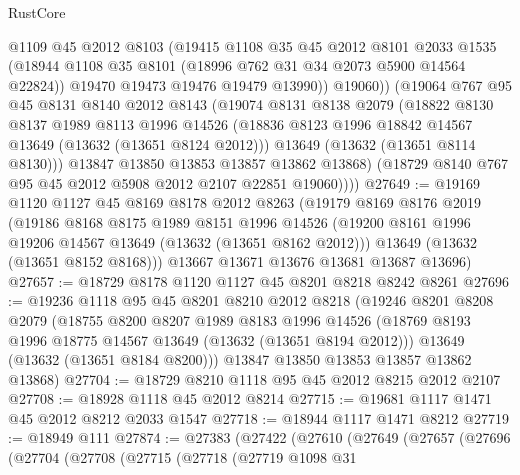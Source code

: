 \begin{lexlean}{RustCore}
\begin{coremodule}
              @1109
              @45
              @2012
              @8103
              (@19415
                @1108
                @35
                @45
                @2012
                @8101
                @2033
                @1535
                (@18944 @1108 @35 @8101 (@18996 @762 @31 @34 @2073 @5900 @14564 @22824))
                @19470
                @19473
                @19476
                @19479
                @13990))
            @19060))
        (@19064
          @767
          @95
          @45
          @8131
          @8140
          @2012
          @8143
          (@19074
            @8131
            @8138
            @2079
            (@18822
              @8130
              @8137
              @1989
              @8113
              @1996
              @14526
              (@18836 @8123 @1996 @18842 @14567 @13649 (@13632 (@13651 @8124 @2012)))
              @13649
              (@13632 (@13651 @8114 @8130)))
            @13847
            @13850
            @13853
            @13857
            @13862
            @13868)
          (@18729 @8140 @767 @95 @45 @2012 @5908 @2012 @2107 @22851 @19060))))
@27649 := @19169
    @1120
    @1127
    @45
    @8169
    @8178
    @2012
    @8263
    (@19179
      @8169
      @8176
      @2019
      (@19186
        @8168
        @8175
        @1989
        @8151
        @1996
        @14526
        (@19200 @8161 @1996 @19206 @14567 @13649 (@13632 (@13651 @8162 @2012)))
        @13649
        (@13632 (@13651 @8152 @8168)))
      @13667
      @13671
      @13676
      @13681
      @13687
      @13696)
@27657 := @18729 @8178 @1120 @1127 @45 @8201 @8218 @8242 @8261
@27696 := @19236
    @1118
    @95
    @45
    @8201
    @8210
    @2012
    @8218
    (@19246
      @8201
      @8208
      @2079
      (@18755
        @8200
        @8207
        @1989
        @8183
        @1996
        @14526
        (@18769 @8193 @1996 @18775 @14567 @13649 (@13632 (@13651 @8194 @2012)))
        @13649
        (@13632 (@13651 @8184 @8200)))
      @13847
      @13850
      @13853
      @13857
      @13862
      @13868)
@27704 := @18729 @8210 @1118 @95 @45 @2012 @8215 @2012 @2107
@27708 := @18928 @1118 @45 @2012 @8214
@27715 := @19681 @1117 @1471 @45 @2012 @8212 @2033 @1547
@27718 := @18944 @1117 @1471 @8212
@27719 := @18949 @111
@27874 := @27383
    (@27422
      (@27610
        (@27649
          (@27657
            (@27696
              (@27704
                (@27708
                  (@27715
                    (@27718
                      (@27719
                        @1098
                        @31

\end{coremodule}
\end{lexlean}
